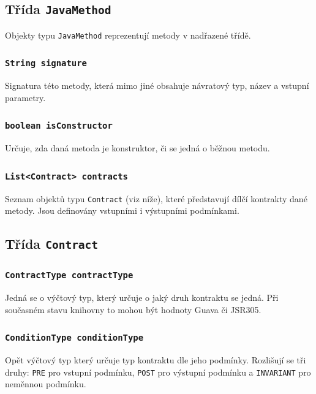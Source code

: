 			
			\subsection{Třída \texttt{JavaMethod}}
				Objekty typu \texttt{JavaMethod} reprezentují metody v nadřazené třídě.
				
				\subsubsection{\texttt{String signature}}
					Signatura této metody, která mimo jiné obsahuje návratový typ, název a vstupní parametry.
					
				\subsubsection{\texttt{boolean isConstructor}}
					Určuje, zda daná metoda je konstruktor, či se jedná o běžnou metodu.
					
				\subsubsection{\texttt{List<Contract> contracts}}
					Seznam objektů typu \texttt{Contract} (viz níže), které představují dílčí kontrakty dané metody. Jsou definovány vstupními i výstupními podmínkami.
						
			
			\subsection{Třída \texttt{Contract}}			
			
				\subsubsection{\texttt{ContractType contractType}} 
					Jedná se o výčtový typ, který určuje o jaký druh kontraktu se jedná. Při současném stavu knihovny to mohou být hodnoty Guava či JSR305.
			
				\subsubsection{\texttt{ConditionType conditionType}} 
					Opět výčtový typ který určuje typ kontraktu dle jeho podmínky. Rozlišují se tři druhy: \texttt{PRE} pro vstupní podmínku, \texttt{POST} pro výstupní podmínku a \texttt{INVARIANT} pro neměnnou podmínku.
			
